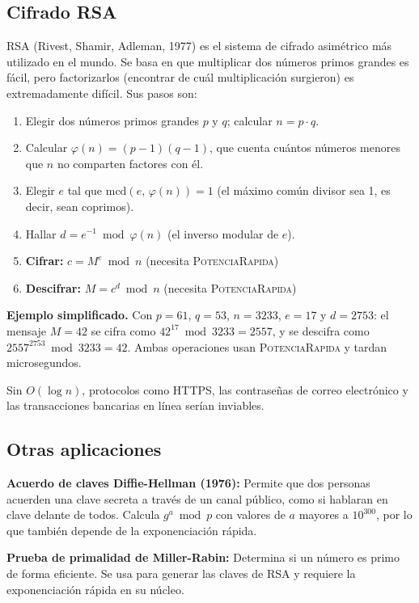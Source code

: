 \documentclass[twocolumn, 10pt]{article}
\begin{document}
\subsection{Cifrado RSA}

RSA (Rivest, Shamir, Adleman, 1977) es el sistema de cifrado asimétrico
más utilizado en el mundo. Se basa en que multiplicar dos números primos
grandes es fácil, pero factorizarlos (encontrar de cuál multiplicación
surgieron) es extremadamente difícil. Sus pasos son:

\begin{enumerate}
  \item Elegir dos números primos grandes $p$ y $q$; calcular $n = p \cdot q$.
  \item Calcular $\varphi(n) = (p-1)(q-1)$, que cuenta cuántos números
        menores que $n$ no comparten factores con él.
  \item Elegir $e$ tal que $\text{mcd}(e,\, \varphi(n)) = 1$
        (el máximo común divisor sea 1, es decir, sean coprimos).
  \item Hallar $d = e^{-1} \bmod \varphi(n)$ (el inverso modular de $e$).
  \item \textbf{Cifrar:} $c = M^e \bmod n$ \quad (necesita \textsc{PotenciaRapida})
  \item \textbf{Descifrar:} $M = c^d \bmod n$ \quad (necesita \textsc{PotenciaRapida})
\end{enumerate}

\textbf{Ejemplo simplificado.} Con $p=61$, $q=53$, $n=3233$, $e=17$ y
$d=2753$: el mensaje $M=42$ se cifra como $42^{17} \bmod 3233 = 2557$, y
se descifra como $2557^{2753} \bmod 3233 = 42$. Ambas operaciones usan
\textsc{PotenciaRapida} y tardan microsegundos.

Sin $O(\log n)$, protocolos como HTTPS, las contraseñas de correo
electrónico y las transacciones bancarias en línea serían inviables.

\subsection{Otras aplicaciones}

\textbf{Acuerdo de claves Diffie-Hellman (1976):} Permite que dos personas
acuerden una clave secreta a través de un canal público, como si hablaran
en clave delante de todos. Calcula $g^a \bmod p$ con valores de $a$
mayores a $10^{300}$, por lo que también depende de la exponenciación
rápida.

\textbf{Prueba de primalidad de Miller-Rabin:} Determina si un número es
primo de forma eficiente. Se usa para generar las claves de RSA y requiere
la exponenciación rápida en su núcleo.
\end{document}
